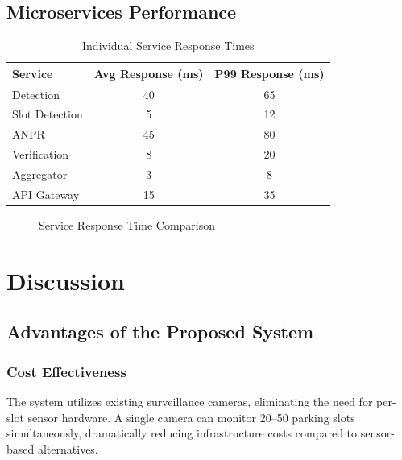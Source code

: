\documentclass[12pt,a4paper]{report}
\begin{document}
\section{Microservices Performance}

\begin{table}[H]
\centering
\caption{Individual Service Response Times}
\begin{tabular}{|l|c|c|}
\hline
\textbf{Service} & \textbf{Avg Response (ms)} & \textbf{P99 Response (ms)} \\
\hline
Detection & 40 & 65 \\
\hline
Slot Detection & 5 & 12 \\
\hline
ANPR & 45 & 80 \\
\hline
Verification & 8 & 20 \\
\hline
Aggregator & 3 & 8 \\
\hline
API Gateway & 15 & 35 \\
\hline
\end{tabular}
\end{table}

\begin{figure}[H]
\centering
{}
\caption{Service Response Time Comparison}
\label{fig:service_response}
\end{figure}


\chapter{Discussion}

\section{Advantages of the Proposed System}

\subsection{Cost Effectiveness}
The system utilizes existing surveillance cameras, eliminating the need for per-slot sensor hardware. A single camera can monitor 20--50 parking slots simultaneously, dramatically reducing infrastructure costs compared to sensor-based alternatives.
\end{document}
